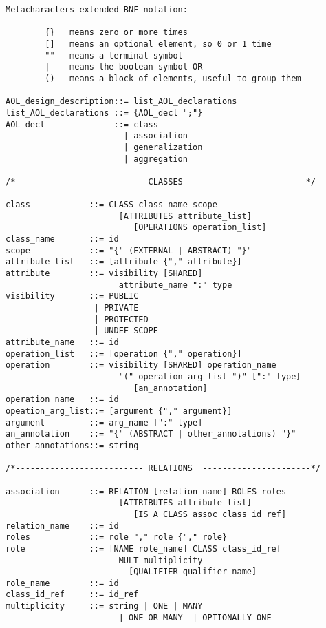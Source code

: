 

%
%
%


\label{chapter:aol}

\begin{scriptsize}
\begin{verbatim}
Metacharacters extended BNF notation:

        {}   means zero or more times
        []   means an optional element, so 0 or 1 time
        ""   means a terminal symbol
        |    means the boolean symbol OR
        ()   means a block of elements, useful to group them

AOL_design_description::= list_AOL_declarations
list_AOL_declarations ::= {AOL_decl ";"}
AOL_decl              ::= class
                        | association
                        | generalization
                        | aggregation

/*-------------------------- CLASSES ------------------------*/

class            ::= CLASS class_name scope
                       [ATTRIBUTES attribute_list]
                          [OPERATIONS operation_list]
class_name       ::= id
scope            ::= "{" (EXTERNAL | ABSTRACT) "}"
attribute_list   ::= [attribute {"," attribute}]
attribute        ::= visibility [SHARED]
                       attribute_name ":" type
visibility       ::= PUBLIC
                  | PRIVATE
                  | PROTECTED
                  | UNDEF_SCOPE
attribute_name   ::= id
operation_list   ::= [operation {"," operation}]
operation        ::= visibility [SHARED] operation_name
                       "(" operation_arg_list ")" [":" type]
                          [an_annotation]
operation_name   ::= id
opeation_arg_list::= [argument {"," argument}]
argument         ::= arg_name [":" type]
an_annotation    ::= "{" (ABSTRACT | other_annotations) "}"
other_annotations::= string

/*-------------------------- RELATIONS  ----------------------*/

association      ::= RELATION [relation_name] ROLES roles
                       [ATTRIBUTES attribute_list]
                          [IS_A_CLASS assoc_class_id_ref]
relation_name    ::= id
roles            ::= role "," role {"," role}
role             ::= [NAME role_name] CLASS class_id_ref
                       MULT multiplicity
                         [QUALIFIER qualifier_name]
role_name        ::= id
class_id_ref     ::= id_ref
multiplicity     ::= string | ONE | MANY
                       | ONE_OR_MANY  | OPTIONALLY_ONE


\end{verbatim}
\end{scriptsize}
